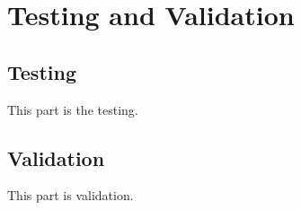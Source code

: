 \section{Testing and Validation}
\subsection{Testing}
This part is the testing.

\clearpage
\subsection{Validation}

This part is validation.